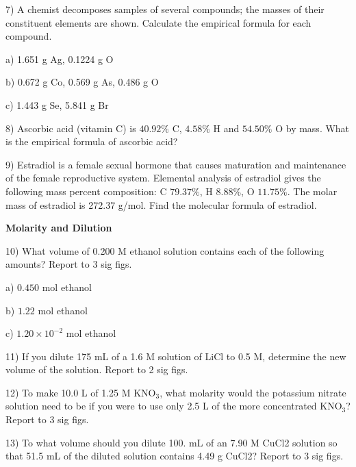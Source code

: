 \documentclass[12pt]{article}
\begin{document}
7) A chemist decomposes samples of several compounds; the masses of their constituent
elements are shown. Calculate the empirical formula for each compound.

a) 1.651 g Ag, 0.1224 g O

b) 0.672 g Co, 0.569 g As, 0.486 g O

c) 1.443 g Se, 5.841 g Br

\vspace{0.5in}

8) Ascorbic acid (vitamin C) is $40.92\%$ C, $4.58\%$ H and $54.50\%$ O by mass.
What is the empirical formula of ascorbic acid?

\vspace{0.5in}

9) Estradiol is a female sexual hormone that causes maturation and maintenance of the female
reproductive system. Elemental analysis of estradiol gives the following mass percent composition:
C $79.37\%$, H $8.88\%$, O $11.75\%$. The molar mass of estradiol is 272.37 g/mol. Find the
molecular formula of estradiol.

\vspace{0.5in}

\textbf{Molarity and Dilution}

10) What volume of 0.200 M ethanol solution contains each of the following amounts?
Report to 3 sig figs.

a) $0.450$ mol ethanol

b) $1.22$ mol ethanol

c) $1.20 \times 10^{-2}$ mol ethanol

\vspace{0.5in}

11) If you dilute 175 mL of a 1.6 M solution of LiCl to 0.5 M, determine the new volume of the
solution. Report to 2 sig figs.

\vspace{1in}

12) To make 10.0 L of 1.25 M KNO$_3$, what molarity would the potassium nitrate solution
need to be if you were to use only 2.5 L of the more concentrated KNO$_3$? Report to 3 sig figs.

\vspace{0.5in}

13) To what volume should you dilute 100. mL of an 7.90 M CuCl2 solution so that 51.5 mL of
the diluted solution contains 4.49 g CuCl2? Report to 3 sig figs.
\end{document}
